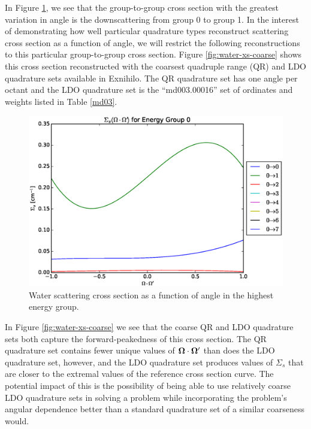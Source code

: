 In Figure \ref{fig:water-xs}, we see that the group-to-group cross section with the
greatest variation in angle is the downscattering from group 0 to group 1. In the 
interest of demonstrating how well particular quadrature types reconstruct scattering
cross section as a function of angle, we will restrict the following reconstructions to
this particular group-to-group cross section. Figure \ref{fig:water-xs-coarse} shows
this cross section reconstructed with the coarsest quadruple range (QR) and LDO 
quadrature sets available in Exnihilo. The QR quadrature set has one angle per octant
and the LDO quadrature set is the ``md003.00016'' set of ordinates and weights listed
in Table \ref{md03}.

\begin{figure}[!htb]
\centering
\includegraphics[width=\textwidth]{img/xs.eps}
\caption{Water scattering cross section as a function of angle in the highest energy group.}
\label{fig:water-xs}
\end{figure}
\FloatBarrier

In Figure \ref{fig:water-xs-coarse} we see that the coarse QR and LDO quadrature
sets both capture the forward-peakedness of this cross section. The QR quadrature set
contains fewer unique values of $\mathbf\Omega\cdot\mathbf\Omega'$ than does the LDO quadrature set,
however, and the LDO quadrature set produces values of $\Sigma_s$ that are closer to
the extremal values of the reference cross section curve. The potential impact of this
is the possibility of being able to use relatively coarse LDO quadrature sets in 
solving a problem while incorporating the problem's angular dependence better than a 
standard quadrature set of a similar coarseness would.

